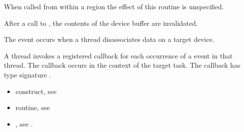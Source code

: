 \begin{ccppspecific}
When called from within a  region
the effect of this routine is unspecified.

After a call to , the contents of the device
buffer are invalidated.

\events
The  event occurs when a thread disassociates data on a target device.

\tools

A thread invokes a registered 
callback for each occurrence of a  event in that thread.
The callback occurs in the context of the target task.  The callback has type signature
.


\crossreferences
\begin{itemize}
\item {} construct, see
\item {} routine, see
\item {}, see
.

\end{itemize}

\end{ccppspecific}
